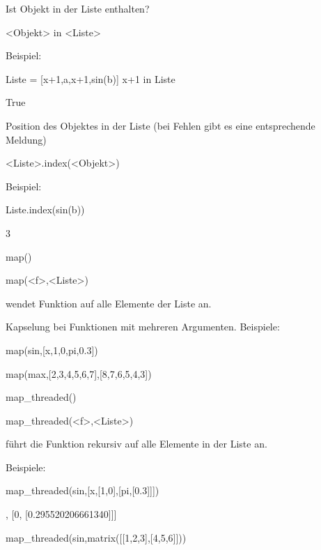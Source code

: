 \documentclass[fontsize=12pt,paper=a4,twoside,bibtotoc,idxtotoc,
liststotoc,pagesize,BCOR1.2cm,DIV15,chapterprefix,pagesize=pdftex]{scrbook}
\theoremstyle{plain}
\theoremstyle{definition}
\theoremstyle{remark}
\begin{document}
  Ist Objekt  in der Liste  enthalten?
\begin{sagein}
 <Objekt> in <Liste>
\end{sagein}
Beispiel:
\begin{sagein}
Liste = [x+1,a,x+1,sin(b)]
x+1 in Liste
\end{sagein}
\begin{sage}
  True
\end{sage}
 Position des Objektes in der Liste (bei Fehlen gibt es eine entsprechende Meldung)
\begin{sagein}
 <Liste>.index(<Objekt>)
\end{sagein}
Beispiel:
\begin{sagein}
Liste.index(sin(b))
\end{sagein}
\begin{sage}
  3
\end{sage}



map()

\begin{sagein}
 map(<f>,<Liste>)
\end{sagein}
wendet Funktion  auf alle Elemente der Liste  an.

  Kapselung bei Funktionen mit mehreren Argumenten.
 Beispiele:
\begin{sagein}
map(sin,[x,1,0,pi,0.3])
\end{sagein}
\begin{sage}
\end{sage}
\begin{sagein}
map(max,[2,3,4,5,6,7],[8,7,6,5,4,3])
\end{sagein}
\begin{sage}
[8, 7, 6, 5, 6, 7]
\end{sage}



map\_threaded()

\begin{sagein}
map_threaded(<f>,<Liste>)
\end{sagein}
führt die Funktion  rekursiv auf alle Elemente in der Liste  an.

  Beispiele:
\begin{sagein}
map_threaded(sin,[x,[1,0],[pi,[0.3]]])
\end{sagein}
\begin{sage}
[sin(x), [sin(1), 0], [0, [0.295520206661340]]]
\end{sage}
\begin{sagein}
map_threaded(sin,matrix([[1,2,3],[4,5,6]]))
\end{sagein}
\begin{sage}
\end{sage}
\end{document}

